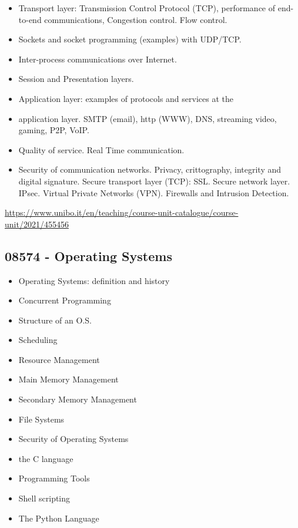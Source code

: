 \documentclass{article}
\begin{document}
\begin{itemize}
\item Transport layer: Transmission Control Protocol (TCP), performance of end-to-end communications, Congestion control. Flow control.
\item Sockets and socket programming (examples) with UDP/TCP.
\item Inter-process communications over Internet.
\item Session and Presentation layers.
\item Application layer: examples of protocols and services at the \item application layer. SMTP (email), http (WWW), DNS, streaming video, gaming, P2P, VoIP.
\item Quality of service. Real Time communication.

\item Security of communication networks. Privacy, crittography, integrity and digital signature. Secure transport layer (TCP): SSL. Secure network layer. IPsec. Virtual Private Networks (VPN). Firewalls and Intrusion Detection.
\end{itemize}

\url{https://www.unibo.it/en/teaching/course-unit-catalogue/course-unit/2021/455456}

\subsection{08574 - Operating Systems}

\begin{itemize}
    \item Operating Systems: definition and history
    \item Concurrent Programming
    \item Structure of an O.S.
    \item Scheduling
    \item Resource Management
    \item Main Memory Management
    \item Secondary Memory Management
    \item File Systems
    \item Security of Operating Systems
    \item the C language
    \item Programming Tools
    \item Shell scripting
    \item The Python Language

\end{itemize}
\end{document}

